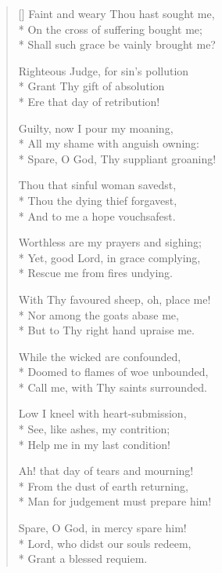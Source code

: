 \begin{verse}[\versewidth]
 Faint and weary Thou hast sought me,\\*
        On the cross of suffering bought me;\\*
        Shall such grace be vainly brought me?

 Righteous Judge, for sin's pollution\\*
        Grant Thy gift of absolution\\*
        Ere that day of retribution!

 Guilty, now I pour my moaning,\\*
        All my shame with anguish owning:\\*
        Spare, O God, Thy suppliant groaning!

 Thou that sinful woman savedst,\\*
        Thou the dying thief forgavest,\\*
        And to me a hope vouchsafest.



 Worthless are my prayers and sighing;\\*
        Yet, good Lord, in grace complying,\\*
        Rescue me from fires undying.

 With Thy favoured sheep, oh, place me!\\*
        Nor among the goats abase me,\\*
        But to Thy right hand upraise me.

 While the wicked are confounded,\\*
        Doomed to flames of woe unbounded,\\*
        Call me, with Thy saints surrounded.

 Low I kneel with heart-submission,\\*
        See, like ashes, my contrition;\\*
        Help me in my last condition!

 Ah! that day of tears and mourning!\\*
From the dust of earth returning,\\*
Man for judgement must prepare him!

 Spare, O God, in mercy spare him!\\*
Lord, who didst our souls redeem,\\*
Grant a blessed requiem.

\end{verse}


